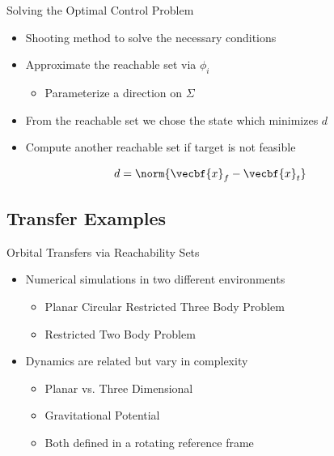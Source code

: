 \begin{frame}{Solving the Optimal Control Problem}

\begin{itemize}
    \item Shooting method to solve the necessary conditions
    \pause
    \item Approximate the reachable set via \( \phi_i \) 
    \begin{itemize}
        \item Parameterize a direction on \( \Sigma \)
    \end{itemize}
    \pause
    \item From the reachable set we chose the state which minimizes \( d \) 
    \item Compute another reachable set if target is not feasible
\end{itemize}
\[
    d = \norm{\vecbf{x}_f - \vecbf{x}_t} 
\]

\end{frame}

\subsection[Transfer examples using Reachability Sets]{Transfer Examples}

\begin{frame}[t]{Orbital Transfers via Reachability Sets}
    \begin{itemize}
        \item Numerical simulations in two different environments
        \begin{itemize}
            \item Planar Circular Restricted Three Body Problem
            \item Restricted Two Body Problem 
        \end{itemize}
        \pause
        \item Dynamics are related but vary in complexity
        \begin{itemize}
            \item Planar vs. Three Dimensional
            \item Gravitational Potential
            \item Both defined in a rotating reference frame
        \end{itemize}
    \end{itemize}
\end{frame}

